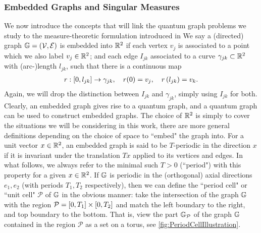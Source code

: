\subsubsection{Embedded Graphs and Singular Measures} \label{sssec:EmbeddedGraphs}
We now introduce the concepts that will link the quantum graph problems we study to the measure-theoretic formulation introduced in 
We say a (directed) graph $\mathbb{G} = \left( \mathcal{V},\mathcal{E} \right)$ is embedded into $\mathbb{R}^2$ if each vertex $v_j$ is associated to a point which we also label $v_j\in\mathbb{R}^2$; and each edge $I_{jk}$ associated to a curve $\gamma_{jk}\subset\mathbb{R}^2$ with (arc-)length $l_{jk}$, such that there is a continuous map
\begin{align*}
	r: \left[ 0,l_{jk} \right] \rightarrow \gamma_{jk}, \quad r(0) = v_j, \quad r\left( l_{jk} \right) = v_k.
\end{align*}
Again, we will drop the distinction between $I_{jk}$ and $\gamma_{jk}$, simply using $I_{jk}$ for both.
Clearly, an embedded graph gives rise to a quantum graph, and a quantum graph can be used to construct embedded graphs.
The choice of $\mathbb{R}^2$ is simply to cover the situations we will be considering in this work, there are more general definitions depending on the choice of space to ``embed" the graph into.
For a unit vector $x\in\mathbb{R}^2$, an embedded graph is said to be $T$-periodic in the direction $x$ if it is invariant under the translation $Tx$ applied to its vertices and edges.
In what follows, we always refer to the minimal such $T>0$ (``period") with this property for a given $x\in\mathbb{R}^2$.
If $\mathbb{G}$ is periodic in the (orthogonal) axial directions $e_1, e_2$ (with periods $T_1, T_2$ respectively), then we can define the ``period cell" or ``unit cell" $\mathcal{P}$ of $\mathbb{G}$ in the obvious manner: take the intersection of the graph $\mathbb{G}$ with the region $\mathcal{P} = \left[ 0,T_1 \right]\times\left[ 0,T_2 \right]$ and match the left boundary to the right, and top boundary to the bottom.
That is, view the part $\mathbb{G}_{\mathcal{P}}$ of the graph $\mathbb{G}$ contained in the region $\mathcal{P}$ as a set on a torus, see \ref{fig:PeriodCellIllustration}.
